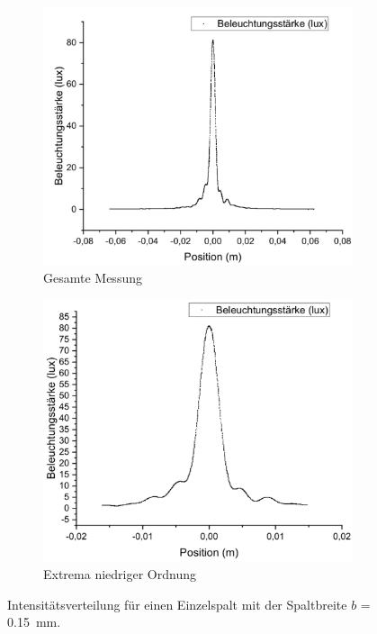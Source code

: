 \documentclass[
	a4paper,
	12pt,
	pagesize,
	ngerman
]{scrartcl}
\begin{document}
	\begin{figure}[H]
		\centering
		\begin{subfigure}{.5\textwidth}
			\centering
			\includegraphics[width=1\linewidth]{Einzelspalt0-150mm}
			\caption{Gesamte Messung}	
		\end{subfigure}%
		\begin{subfigure}{.5\textwidth}
			\centering
			\includegraphics[width=1\linewidth]{Einzelspalt0-150mmZOOM}
			\caption{Extrema niedriger Ordnung}
		\end{subfigure}
		\caption{Intensitätsverteilung für einen Einzelspalt mit der Spaltbreite $b$ = \SI{0,15}{mm}.}
		\label{Einzelspalt0-150mm}

	\end{figure}	
\end{document}
